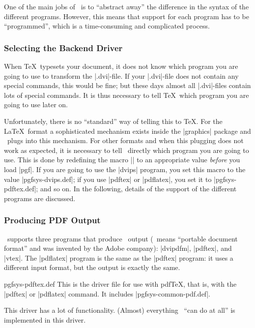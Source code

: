 One of the main jobs of \pgfname\ is to ``abstract away'' the difference in the
syntax of the different programs. However, this means that support for each
program has to be ``programmed'', which is a time-consuming and complicated
process.


\subsubsection{Selecting the Backend Driver}

When \TeX\ typesets your document, it does not know which program you are going
to use to transform the |.dvi|-file. If your |.dvi|-file does not contain any
special commands, this would be fine; but these days almost all |.dvi|-files
contain lots of special commands. It is thus necessary to tell \TeX\ which
program you are going to use later on.

Unfortunately, there is no ``standard'' way of telling this to \TeX. For the
\LaTeX\ format a sophisticated mechanism exists inside the |graphics| package
and \pgfname\ plugs into this mechanism. For other formats and when this
plugging does not work as expected, it is necessary to tell \pgfname\ directly
which program you are going to use. This is done by redefining the macro
|\pgfsysdriver| to an appropriate value \emph{before} you load |pgf|. If you
are going to use the |dvips| program, you set this macro to the value
|pgfsys-dvips.def|; if you use |pdftex| or |pdflatex|, you set it to
|pgfsys-pdftex.def|; and so on. In the following, details of the support of the
different programs are discussed.


\subsubsection{Producing PDF Output}

\pgfname\ supports three programs that produce \pdf\ output (\pdf\ means
``portable document format'' and was invented by the Adobe company): |dvipdfm|,
|pdftex|, and |vtex|. The |pdflatex| program is the same as the |pdftex|
program: it uses a different input format, but the output is exactly the same.

\begin{filedescription}{pgfsys-pdftex.def}
    This is the driver file for use with pdf\TeX, that is, with the |pdftex| or
    |pdflatex| command. It includes |pgfsys-common-pdf.def|.

    This driver has a lot of functionality. (Almost) everything \pgfname\ ``can
    do at all'' is implemented in this driver.
\end{filedescription}

